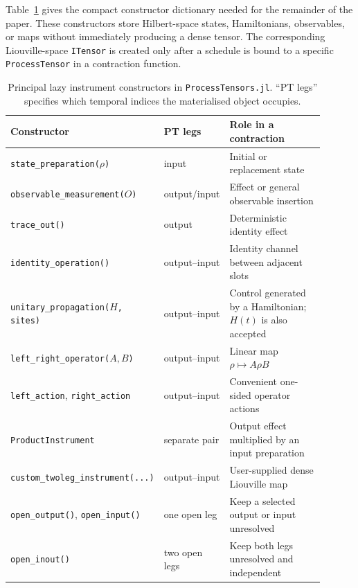 Table~\ref{tab:instrument-dictionary} gives the compact constructor dictionary needed for the remainder of the paper.
These constructors store Hilbert-space states, Hamiltonians, observables, or maps without immediately producing a dense tensor.
The corresponding Liouville-space \texttt{ITensor} is created only after a schedule is bound to a specific \texttt{ProcessTensor} in a contraction function.
%
\begin{table}[t]
    \centering
    \small
    {
    \begin{tabular}{@{}p{0.35\linewidth}p{0.15\linewidth}p{0.40\linewidth}@{}}
        \hline
        Constructor & PT legs & Role in a contraction \\
        \hline
        \texttt{state\_preparation(\(\rho\))} & input & Initial or replacement state \\
        \texttt{observable\_measurement(\(O\))} & output/input & Effect or general observable insertion \\
        \texttt{trace\_out()} & output & Deterministic identity effect \\
        \texttt{identity\_operation()} & output--input & Identity channel between adjacent slots \\
        \texttt{unitary\_propagation(\(H\), sites)} & output--input & Control generated by a Hamiltonian; \(H(t)\) is also accepted \\
        \texttt{left\_right\_operator(\(A,B\))} & output--input & Linear map \(\rho\mapsto A\rho B\) \\
        \texttt{left\_action}, \texttt{right\_action} & output--input & Convenient one-sided operator actions \\
        \texttt{ProductInstrument} & separate pair & Output effect multiplied by an input preparation \\
        \texttt{custom\_twoleg\_}\newline\texttt{instrument(...)} & output--input & User-supplied dense Liouville map \\
        \texttt{open\_output()}, \texttt{open\_input()} & one open leg & Keep a selected output or input unresolved \\
        \texttt{open\_inout()} & two open legs & Keep both legs unresolved and independent \\
        \hline
    \end{tabular}}
    \caption{
        Principal lazy instrument constructors in \texttt{ProcessTensors.jl}.
        ``PT legs'' specifies which temporal indices the materialised object occupies.
    }
    \label{tab:instrument-dictionary}
\end{table}
